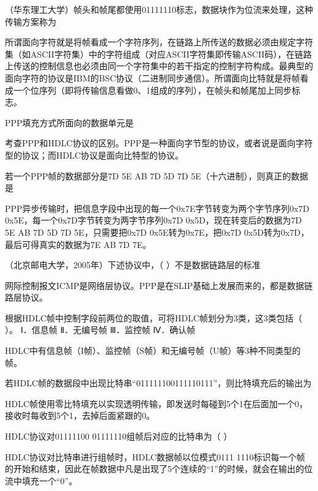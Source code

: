 \question （华东理工大学）帧头和帧尾都使用01111110标志，数据块作为位流来处理，这种传输方案称为
\par{}
\begin{solution}所谓面向字符就是将帧看成一个字符序列，在链路上所传送的数据必须由规定字符集（如ASCII字符集）中的字符组成（对应ASCII字符集即传输ASCII码），在链路上传送的控制信息也必须由同一个字符集中的若干指定的控制字符构成。最典型的面向字符的协议是IBM的BSC协议（二进制同步通信）。所谓面向比特就是将帧看成一个位序列（即将传输信息看做0、1组成的序列），在帧头和帧尾加上同步标志。
\end{solution}
\question PPP填充方式所面向的数据单元是
\par{}
\begin{solution}考查PPP和HDLC协议的区别。PPP是一种面向字节型的协议，或者说是面向字符型的协议；而HDLC协议是面向比特型的协议。
\end{solution}
\question 若一个PPP帧的数据部分是7D 5E AB 7D 5D 7D 5E（十六进制），则真正的数据是
\par{}
\begin{solution}PPP异步传输时，把信息字段中出现的每一个0x7E字节转变为两个字节序列0x7D
0x5E，每一个0x7D字节转变为两字节序列0x7D 0x5D，现在转变后的数据为7D 5E
AB 7D 5D 7D 5E，只需要把0x7D 0x5E转为0x7E，把0x7D
0x5D转为0x7D，最后可得真实的数据为7E AB 7D 7E。
\end{solution}
\question （北京邮电大学，2005年）下述协议中，（ ）不是数据链路层的标准
\par{}
\begin{solution}网际控制报文ICMP是网络层协议。PPP是在SLIP基础上发展而来的，都是数据链路层协议。
\end{solution}
\question 根据HDLC帧中控制字段前两位的取值，可将HDLC帧划分为3类，这3类包括（ ）。
Ⅰ．信息帧 Ⅱ．无编号帧 Ⅲ．监控帧 Ⅳ．确认帧
\par{}
\begin{solution}HDLC中有信息帧（I帧）、监控帧（S帧）和无编号帧（U帧）等3种不同类型的帧。
\end{solution}
\question 若HDLC帧的数据段中出现比特串``011111100111110111''，则比特填充后的输出为
\par{}
\begin{solution}HDLC帧使用零比特填充以实现透明传输，即发送时每碰到5个1在后面加一个0，接收时每收到5个1，去掉后面紧跟的0。
\end{solution}
\question HDLC协议对01111100 01111110组帧后对应的比特串为（ ）
\par{}
\begin{solution}HDLC协议对比特串进行组帧时，HDLC数据帧以位模式0111
1110标识每一个帧的开始和结束，因此在帧数据中凡是出现了5个连续的``1''的时候，就会在输出的位流中填充一个``0''。
\end{solution}
